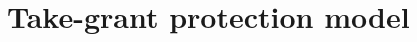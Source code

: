 
\graphicspath{ {./src/} } 
\usepackage{hyperref}

\newcommand{\dozent}{Volker Roth}
\newcommand{\tutor}{Oliver Wiese}
\newcommand{\tutoriumNo}{02\\Materialien: Latex, VSC, Skript}
\newcommand{\ubungNo}{03}
\newcommand{\veranstaltung}{Rechnersicherheit}
\newcommand{\semester}{SoSe 21}




\section{Take-grant protection model}
\begin{enumerate}[(a)]
   
    
\end{enumerate}

